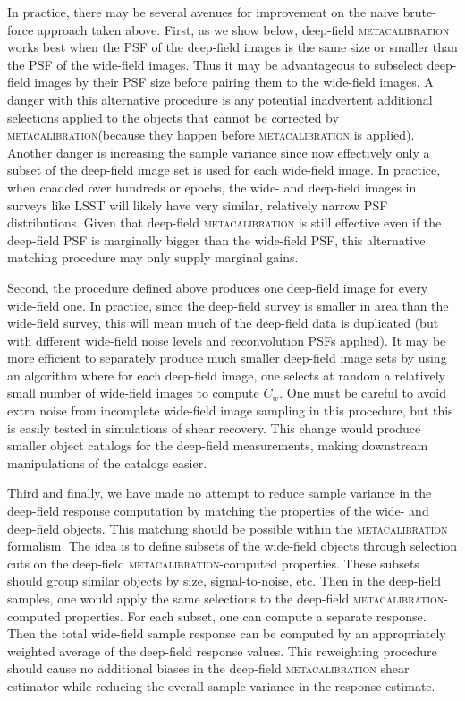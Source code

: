 \documentclass[twocolumn]{openjournal}
\makeatletter
\newcommand{\mcal}{\textsc{metacalibration}\@\xspace}
\makeatother
\begin{document}
In practice, there may be several avenues for improvement on the naive brute-force
approach taken above. First, as we show below, deep-field \mcal works best when the PSF
of the deep-field images is the same size or smaller than the PSF of the wide-field
images. Thus it may be advantageous to subselect deep-field images by their PSF size
before pairing them to the wide-field images. A danger with this alternative procedure
is any potential inadvertent additional selections applied to the objects that cannot be
corrected by \mcal (because they happen before \mcal is applied). Another danger is
increasing the sample variance since now effectively only a subset of the deep-field
image set is used for each wide-field image. In practice, when coadded over hundreds or
epochs, the wide- and deep-field images in surveys like LSST will likely have very
similar, relatively narrow PSF distributions. Given that deep-field \mcal is still
effective even if the deep-field PSF is marginally bigger than the wide-field PSF, this
alternative matching procedure may only supply marginal gains.

Second, the procedure defined above produces one deep-field image for every wide-field
one. In practice, since the deep-field survey is smaller in area than the wide-field
survey, this will mean much of the deep-field data is duplicated (but with different
wide-field noise levels and reconvolution PSFs applied). It may be more efficient to
separately produce much smaller deep-field image sets by using an algorithm where for
each deep-field image, one selects at random a relatively small number of wide-field
images to compute $C_{w}$. One must be careful to avoid extra noise from incomplete
wide-field image sampling in this procedure, but this is easily tested in simulations of
shear recovery. This change would produce smaller object catalogs for the
deep-field measurements, making downstream manipulations of the catalogs easier.

Third and finally, we have made no attempt to reduce sample variance in the deep-field
response computation by matching the properties of the wide- and deep-field objects.
This matching should be possible within the \mcal formalism. The idea is to define
subsets of the wide-field objects through selection cuts on the deep-field
\mcal-computed properties. These subsets should group similar objects by size,
signal-to-noise, etc. Then in the deep-field samples, one would apply the same
selections to the deep-field \mcal-computed properties. For each subset, one can compute
a separate response. Then the total wide-field sample response can be computed by an
appropriately weighted average of the deep-field response values. This reweighting
procedure should cause no additional biases in the deep-field \mcal shear estimator
while reducing the overall sample variance in the response estimate.
\end{document}
